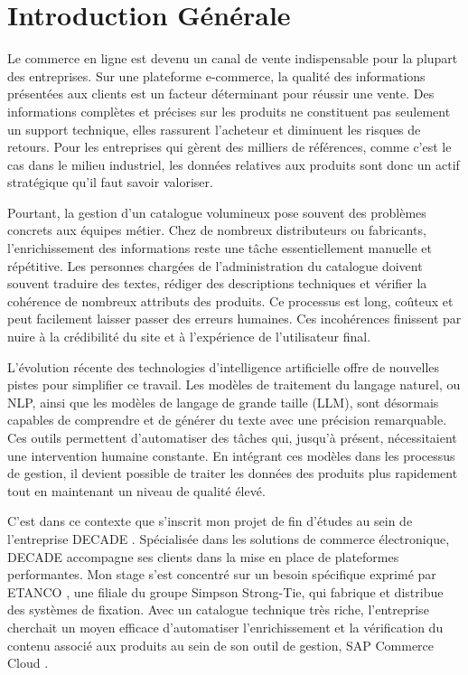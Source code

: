 ﻿\chapter*{Introduction Générale}
\label{chap:introduction}

\sloppy
{}

Le commerce en ligne est devenu un canal de vente indispensable pour la plupart des entreprises. Sur une plateforme e-commerce, la qualité des informations présentées aux clients est un facteur déterminant pour réussir une vente. Des informations complètes et précises sur les produits ne constituent pas seulement un support technique, elles rassurent l'acheteur et diminuent les risques de retours. Pour les entreprises qui gèrent des milliers de références, comme c'est le cas dans le milieu industriel, les données relatives aux produits sont donc un actif stratégique qu'il faut savoir valoriser.

Pourtant, la gestion d'un catalogue volumineux pose souvent des problèmes concrets aux équipes métier. Chez de nombreux distributeurs ou fabricants, l'enrichissement des informations reste une tâche essentiellement manuelle et répétitive. Les personnes chargées de l'administration du catalogue doivent souvent traduire des textes, rédiger des descriptions techniques et vérifier la cohérence de nombreux attributs des produits. Ce processus est long, coûteux et peut facilement laisser passer des erreurs humaines. Ces incohérences finissent par nuire à la crédibilité du site et à l'expérience de l'utilisateur final.

L'évolution récente des technologies d'intelligence artificielle offre de nouvelles pistes pour simplifier ce travail. Les modèles de traitement du langage naturel, ou NLP, ainsi que les modèles de langage de grande taille (LLM), sont désormais capables de comprendre et de générer du texte avec une précision remarquable. Ces outils permettent d'automatiser des tâches qui, jusqu'à présent, nécessitaient une intervention humaine constante. En intégrant ces modèles dans les processus de gestion, il devient possible de traiter les données des produits plus rapidement tout en maintenant un niveau de qualité élevé.

C'est dans ce contexte que s'inscrit mon projet de fin d'études au sein de l'entreprise DECADE . Spécialisée dans les solutions de commerce électronique, DECADE accompagne ses clients dans la mise en place de plateformes performantes. Mon stage s'est concentré sur un besoin spécifique exprimé par ETANCO , une filiale du groupe Simpson Strong-Tie, qui fabrique et distribue des systèmes de fixation. Avec un catalogue technique très riche, l'entreprise cherchait un moyen efficace d'automatiser l'enrichissement et la vérification du contenu associé aux produits au sein de son outil de gestion, SAP Commerce Cloud .

